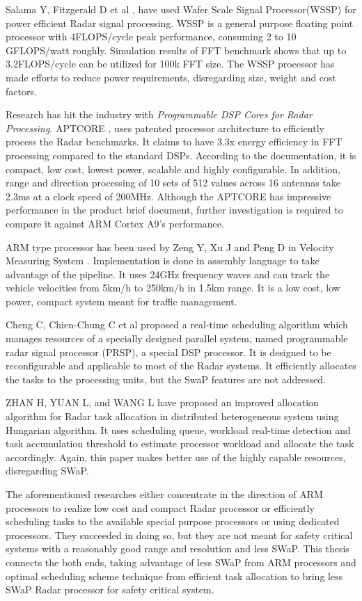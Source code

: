 Salama Y, Fitzgerald D et al \cite{relWork3}, have used Wafer Scale Signal Processor(WSSP) for power efficient Radar signal processing. WSSP is a general purpose floating point processor with 4FLOPS/cycle peak performance, consuming 2 to 10 GFLOPS/watt roughly. Simulation results of FFT benchmark shows that up to 3.2FLOPS/cycle can be utilized for 100k FFT size. The WSSP processor has made efforts to reduce power requirements, disregarding size, weight and cost factors.

Research has hit the industry with \textsl{Programmable DSP Cores for Radar Processing}. APTCORE \cite{relWork4}, uses patented processor architecture to efficiently process the Radar benchmarks. It claims to have 3.3x energy efficiency in FFT processing compared to the standard DSPs. According to the documentation, it is compact, low cost, lowest power, scalable and highly configurable. In addition, range and direction processing of 10 sets of 512 values across 16 antennas take 2.3ms at a clock speed of 200MHz. Although the APTCORE has impressive performance in the product brief document, further investigation is required to compare it against ARM Cortex A9's performance.

ARM type processor has been used by Zeng Y, Xu J and Peng D in Velocity Measuring System \cite{relWork2}. Implementation is done in assembly language to take advantage of the pipeline. It uses 24GHz frequency waves and can track the vehicle velocities from 5km/h to 250km/h in 1.5km range. It is a low cost, low power, compact system meant for traffic management.

Cheng C, Chien-Chung C et al \cite{RTsched} proposed a real-time scheduling algorithm which manages resources of a specially designed parallel system, named programmable radar signal processor (PRSP), a special DSP processor. It is designed to be reconfigurable and applicable to most of the Radar systems. It efficiently allocates the tasks to the processing units, but the SwaP features are not addressed.

ZHAN H, YUAN L, and WANG L \cite{RTschedParallel} have proposed an improved allocation algorithm for Radar task allocation in distributed heterogeneous system using Hungarian algorithm. It uses scheduling queue, workload real-time detection and task accumulation threshold to estimate processor workload and allocate the task accordingly. Again, this paper makes better use of the highly capable resources, disregarding SWaP.

The aforementioned researches either concentrate in the direction of ARM processors to realize low cost and compact Radar processor or efficiently scheduling tasks to the available special purpose processors or using dedicated processors. They succeeded in doing so, but they are not meant for safety critical systems with a reasonably good range and resolution and less SWaP. This thesis connects the both ends, taking advantage of less SWaP from ARM processors and optimal scheduling scheme technique from efficient task allocation to bring less SWaP Radar processor for safety critical system.

